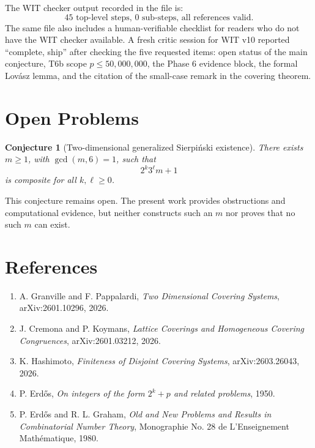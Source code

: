 \documentclass[11pt]{article}
\newtheorem{conjecture}[theorem]{Conjecture}
\theoremstyle{definition}
\theoremstyle{remark}
\begin{document}
The WIT checker output recorded in the file is:
\[
        \text{45 top-level steps, 0 sub-steps, all references valid.}
\]
The same file also includes a human-verifiable checklist for readers who do not
have the WIT checker available.  A fresh critic session for WIT v10 reported
``complete, ship'' after checking the five requested items: open status of the
main conjecture, T6b scope \(p\leq 50{,}000{,}000\), the Phase 6 evidence
block, the formal Lov\'asz lemma, and the citation of the small-case remark in
the covering theorem.

\section{Open Problems}

\begin{conjecture}[Two-dimensional generalized Sierpi\'nski existence]
There exists \(m\geq 1\), with \(\gcd(m,6)=1\), such that
\[
        2^k3^\ell m+1
\]
is composite for all \(k,\ell\geq 0\).
\end{conjecture}

This conjecture remains open.  The present work provides obstructions and
computational evidence, but neither constructs such an \(m\) nor proves that no
such \(m\) can exist.

\section*{References}

\begin{enumerate}
    \item A. Granville and F. Pappalardi, \emph{Two Dimensional Covering
    Systems}, arXiv:2601.10296, 2026.

    \item J. Cremona and P. Koymans, \emph{Lattice Coverings and Homogeneous
    Covering Congruences}, arXiv:2601.03212, 2026.

    \item K. Hashimoto, \emph{Finiteness of Disjoint Covering Systems},
    arXiv:2603.26043, 2026.

    \item P. Erd\H{o}s, \emph{On integers of the form \(2^k+p\) and related
    problems}, 1950.

    \item P. Erd\H{o}s and R. L. Graham, \emph{Old and New Problems and Results
    in Combinatorial Number Theory}, Monographie No. 28 de L'Enseignement
    Math\'ematique, 1980.
\end{enumerate}
\end{document}
